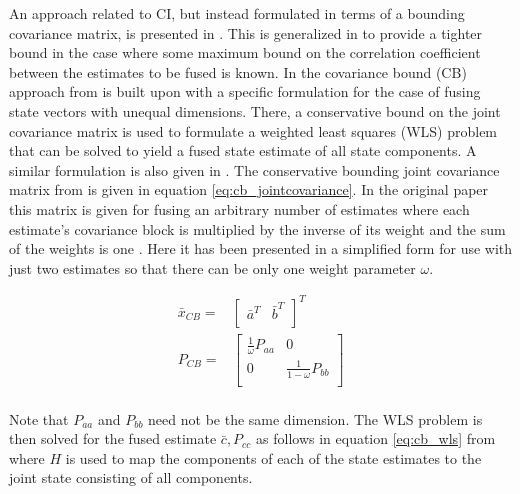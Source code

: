 \documentclass[journal]{IEEEtran}
\begin{document}
An approach related to CI, but instead formulated in terms of a bounding covariance matrix, is presented in \cite{hanebeck2001new}. This is generalized in \cite{hanebeck2001tight} to provide a tighter bound in the case where some maximum bound on the correlation coefficient between the estimates to be fused is known. In \cite{noack2014fusion} the covariance bound (CB) approach from \cite{hanebeck2001new, hanebeck2001tight} is built upon with a specific formulation for the case of fusing state vectors with unequal dimensions. There, a conservative bound on the joint covariance matrix is used to formulate a weighted least squares (WLS) problem that can be solved to yield a fused state estimate of all state components. A similar formulation is also given in \cite{li2021cooperative}. The conservative bounding joint covariance matrix from \cite{noack2014fusion} is given in equation \ref{eq:cb_jointcovariance}. In the original paper this matrix is given for fusing an arbitrary number of estimates where each estimate's covariance block is multiplied by the inverse of its weight and the sum of the weights is one \cite{noack2014fusion}. Here it has been presented in a simplified form for use with just two estimates so that there can be only one weight parameter $\omega$.

\begin{equation}
\begin{aligned}
    \bar{x}_{CB} = {}& \begin{bmatrix}
                        \bar{a}^T & \bar{b}^T \\
                    \end{bmatrix}^{T} \\
    P_{CB} = {}& \begin{bmatrix}
                        \frac{1}{\omega} P_{aa} & 0 \\
                        0 & \frac{1}{1 - \omega}P_{bb} \\
                    \end{bmatrix} \\
\end{aligned} \label{eq:cb_jointcovariance}
\end{equation}

Note that $P_{aa}$ and $P_{bb}$ need not be the same dimension. The WLS problem is then solved for the fused estimate $\bar{c}, P_{cc}$ as follows in equation \ref{eq:cb_wls} from \cite{noack2014fusion} where $H$ is used to map the components of each of the state estimates to the joint state consisting of all components.
\end{document}
